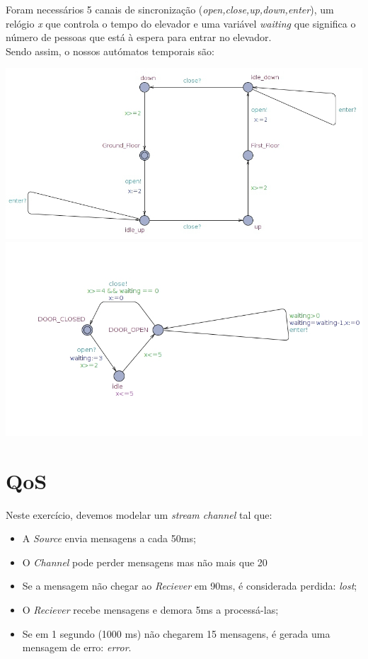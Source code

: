 \documentclass[12pt]{article} %
\begin{document}
Foram necessários 5 canais de sincronização ({\it{open,close,up,down,enter}}), um relógio {\it{x}} que controla o tempo do elevador e uma variável {\it{waiting}} que significa o número de pessoas que está à espera para entrar no elevador.
\\
Sendo assim, o nossos autómatos temporais são:
\begin{center}
\includegraphics[scale=0.4]{elevator.jpg}
\includegraphics[scale=0.4]{door.jpg}
\end{center}


\section{QoS} 

Neste exercício, devemos modelar um {\it{stream channel}} tal que:
\begin{itemize}
\item A {\it{Source}} envia mensagens a cada 50ms;
\item O {\it{Channel}} pode perder mensagens mas não mais que 20%
\item Se a mensagem não chegar ao {\it{Reciever}} em 90ms, é considerada perdida: {\it{lost}};
\item O {\it{Reciever}} recebe mensagens e demora 5ms a processá-las;
\item Se em 1 segundo (1000 ms) não chegarem 15 mensagens, é gerada uma mensagem de erro: {\it{error}}.
\end{itemize}



\end{document}
